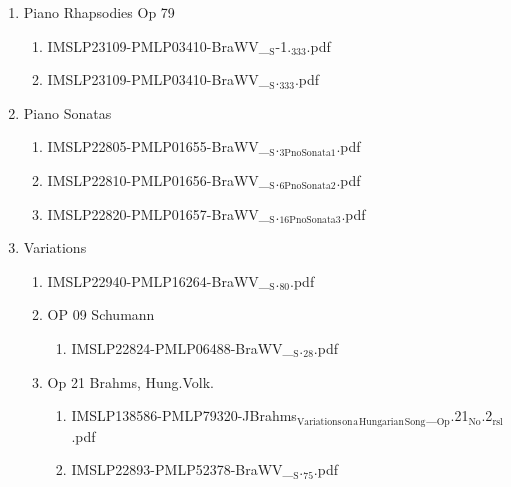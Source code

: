 \documentclass[11pt]{article}
\begin{document}
\begin{enumerate}
\begin{enumerate}
\item Piano Rhapsodies Op 79
\label{sec-1-1-1-1-44-15-9-5}
\begin{enumerate}
\item IMSLP23109-PMLP03410-BraWV\_$_{\text{S}}$-1.$_{\text{333}}$.pdf
\label{sec-1-1-1-1-44-15-9-5-1}

\item IMSLP23109-PMLP03410-BraWV\_$_{\text{S}}$.$_{\text{333}}$.pdf
\label{sec-1-1-1-1-44-15-9-5-2}
\end{enumerate}

\item Piano Sonatas
\label{sec-1-1-1-1-44-15-9-6}
\begin{enumerate}
\item IMSLP22805-PMLP01655-BraWV\_$_{\text{S}}$.$_{\text{3PnoSonata1}}$.pdf
\label{sec-1-1-1-1-44-15-9-6-1}

\item IMSLP22810-PMLP01656-BraWV\_$_{\text{S}}$.$_{\text{6PnoSonata2}}$.pdf
\label{sec-1-1-1-1-44-15-9-6-2}

\item IMSLP22820-PMLP01657-BraWV\_$_{\text{S}}$.$_{\text{16PnoSonata3}}$.pdf
\label{sec-1-1-1-1-44-15-9-6-3}
\end{enumerate}

\item Variations
\label{sec-1-1-1-1-44-15-9-7}
\begin{enumerate}
\item IMSLP22940-PMLP16264-BraWV\_$_{\text{S}}$.$_{\text{80}}$.pdf
\label{sec-1-1-1-1-44-15-9-7-1}

\item OP 09 Schumann
\label{sec-1-1-1-1-44-15-9-7-2}
\begin{enumerate}
\item IMSLP22824-PMLP06488-BraWV\_$_{\text{S}}$.$_{\text{28}}$.pdf
\label{sec-1-1-1-1-44-15-9-7-2-1}
\end{enumerate}

\item Op 21 Brahms, Hung.Volk.
\label{sec-1-1-1-1-44-15-9-7-3}
\begin{enumerate}
\item IMSLP138586-PMLP79320-JBrahms$_{\text{Variations}}$$_{\text{on}}$$_{\text{a}}$$_{\text{Hungarian}}$$_{\text{Song}}$\_$_{\text{Op}}$.21$_{\text{No}}$.2$_{\text{rsl}}$.pdf
\label{sec-1-1-1-1-44-15-9-7-3-1}

\item IMSLP22893-PMLP52378-BraWV\_$_{\text{S}}$.$_{\text{75}}$.pdf
\label{sec-1-1-1-1-44-15-9-7-3-2}


\end{enumerate}
\end{enumerate}
\end{enumerate}
\end{enumerate}
\end{document}
